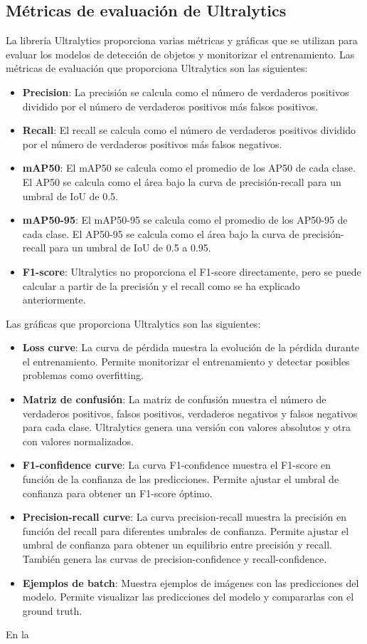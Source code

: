 \subsection{Métricas de evaluación de Ultralytics}
La librería Ultralytics proporciona varias métricas y gráficas que se utilizan para evaluar los modelos de detección de objetos y monitorizar el entrenamiento. Las métricas de evaluación que proporciona Ultralytics son las siguientes:
\begin{itemize}
    \item \textbf{Precision}: La precisión se calcula como el número de verdaderos positivos dividido por el número de verdaderos positivos más falsos positivos.
    \item \textbf{Recall}: El recall se calcula como el número de verdaderos positivos dividido por el número de verdaderos positivos más falsos negativos.
    \item \textbf{mAP50}: El mAP50 se calcula como el promedio de los AP50 de cada clase. El AP50 se calcula como el área bajo la curva de precisión-recall para un umbral de IoU de 0.5.
    \item \textbf{mAP50-95}: El mAP50-95 se calcula como el promedio de los AP50-95 de cada clase. El AP50-95 se calcula como el área bajo la curva de precisión-recall para un umbral de IoU de 0.5 a 0.95.
    \item \textbf{F1-score}: Ultralytics no proporciona el F1-score directamente, pero se puede calcular a partir de la precisión y el recall como se ha explicado anteriormente.
\end{itemize}

Las gráficas que proporciona Ultralytics son las siguientes:

\begin{itemize}
    \item \textbf{Loss curve}: La curva de pérdida muestra la evolución de la pérdida durante el entrenamiento. Permite monitorizar el entrenamiento y detectar posibles problemas como overfitting.
    \item \textbf{Matriz de confusión}: La matriz de confusión muestra el número de verdaderos positivos, falsos positivos, verdaderos negativos y falsos negativos para cada clase. Ultralytics genera una versión con valores absolutos y otra con valores normalizados.
    \item \textbf{F1-confidence curve}: La curva F1-confidence muestra el F1-score en función de la confianza de las predicciones. Permite ajustar el umbral de confianza para obtener un F1-score óptimo.
    \item \textbf{Precision-recall curve}: La curva precision-recall muestra la precisión en función del recall para diferentes umbrales de confianza. Permite ajustar el umbral de confianza para obtener un equilibrio entre precisión y recall. También genera las curvas de precision-confidence y recall-confidence.
    \item \textbf{Ejemplos de batch}: Muestra ejemplos de imágenes con las predicciones del modelo. Permite visualizar las predicciones del modelo y compararlas con el ground truth.
\end{itemize}

En la 